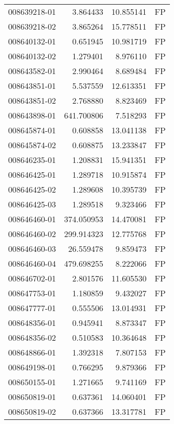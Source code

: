 \begin{tabular}{lrrl}
008639218-01 &    3.864433 &      10.855141 &   FP \\
008639218-02 &    3.865264 &      15.778511 &   FP \\
008640132-01 &    0.651945 &      10.981719 &   FP \\
008640132-02 &    1.279401 &       8.976110 &   FP \\
008643582-01 &    2.990464 &       8.689484 &   FP \\
008643851-01 &    5.537559 &      12.613351 &   FP \\
008643851-02 &    2.768880 &       8.823469 &   FP \\
008643898-01 &  641.700806 &       7.518293 &   FP \\
008645874-01 &    0.608858 &      13.041138 &   FP \\
008645874-02 &    0.608875 &      13.233847 &   FP \\
008646235-01 &    1.208831 &      15.941351 &   FP \\
008646425-01 &    1.289718 &      10.915874 &   FP \\
008646425-02 &    1.289608 &      10.395739 &   FP \\
008646425-03 &    1.289518 &       9.323466 &   FP \\
008646460-01 &  374.050953 &      14.470081 &   FP \\
008646460-02 &  299.914323 &      12.775768 &   FP \\
008646460-03 &   26.559478 &       9.859473 &   FP \\
008646460-04 &  479.698255 &       8.222066 &   FP \\
008646702-01 &    2.801576 &      11.605530 &   FP \\
008647753-01 &    1.180859 &       9.432027 &   FP \\
008647777-01 &    0.555506 &      13.014931 &   FP \\
008648356-01 &    0.945941 &       8.873347 &   FP \\
008648356-02 &    0.510583 &      10.364648 &   FP \\
008648866-01 &    1.392318 &       7.807153 &   FP \\
008649198-01 &    0.766295 &       9.879366 &   FP \\
008650155-01 &    1.271665 &       9.741169 &   FP \\
008650819-01 &    0.637361 &      14.060401 &   FP \\
008650819-02 &    0.637366 &      13.317781 &   FP \\

\end{tabular}
